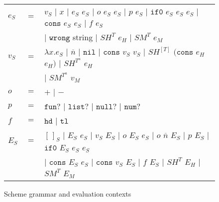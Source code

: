 \begin{figure}[p]
\centering
\begin{tabular}{lcl}
\vspace{5pt}

$e_{S}$ & $=$ & $v_{S}$ $\vert$ $x$ $\vert$ $e_{S}$ $e_{S}$ $\vert$ $o$ $e_{S}$ $e_{S}$ $\vert$ $p$ $e_{S}$ $\vert$ $\mathtt{if0}$ $e_{S}$ $e_{S}$ $e_{S}$ $\vert$ $\mathtt{cons}$ $e_{S}$ $e_{S}$ $\vert$ $f$ $e_{S}$ \\

\vspace{5pt}

&& $\vert$ $\mathtt{wrong}$ string $\vert$ $SH^{T}$ $e_{H}$ $\vert$ $SM^{T}$ $e_{M}$ \\

\vspace{5pt}

$v_{S}$ & $=$ & $\lambda x.e_{S}$ $\vert$ $\overline{n}$ $\vert$ $\mathtt{nil}$ $\vert$ $\mathtt{cons}$ $v_{S}$ $v_{S}$ $\vert$ $SH^{[T]}$ $(\mathtt{cons}$ $e_{H}$ $e_{H})$ $\vert$ $SH^{T^{a}}$ $e_{H}$ \\

\vspace{5pt}

&& $\vert$ $SM^{T^{a}}$ $v_{M}$ \\

\vspace{5pt}

$o$ & $=$ & $+$ $\vert$ $-$ \\

\vspace{5pt}

$p$ & $=$ & $\mathtt{fun?}$ $\vert$ $\mathtt{list?}$ $\vert$ $\mathtt{null?}$ $\vert$ $\mathtt{num?}$ \\

\vspace{5pt}

$f$ & $=$ & $\mathtt{hd}$ $\vert$ $\mathtt{tl}$ \\

\vspace{5pt}

$E_{S}$ & $=$ & $[\,]_{S}$ $\vert$ $E_{S}$ $e_{S}$ $\vert$ $v_{S}$ $E_{S}$ $\vert$ $o$ $E_{S}$ $e_{S}$ $\vert$ $o$ $\overline{n}$ $E_{S}$ $\vert$ $p$ $E_{S}$ $\vert$ $\mathtt{if0}$ $E_{S}$ $e_{S}$ $e_{S}$ \\

\vspace{5pt}

&& $\vert$ $\mathtt{cons}$ $E_{S}$ $e_{S}$ $\vert$ $\mathtt{cons}$ $v_{S}$ $E_{S}$ $\vert$ $f$ $E_{S}$ $\vert$ $SH^{T}$ $E_{H}$ $\vert$ $SM^{T}$ $E_{M}$
\end{tabular}
\caption{Scheme grammar and evaluation contexts}
\label{csg}
\end{figure}